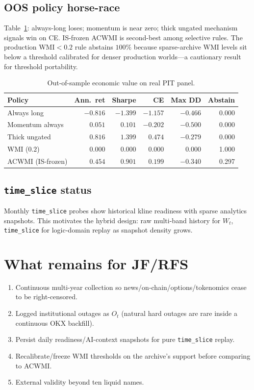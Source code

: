 \documentclass[12pt]{article}
\begin{document}
\subsection{OOS policy horse-race}
Table~\ref{tab:econ}: always-long loses; momentum is near zero; thick ungated mechanism signals win on CE. IS-frozen ACWMI is second-best among selective rules. The production WMI$<0.2$ rule abstains $100\%$ because sparse-archive WMI levels sit below a threshold calibrated for denser production worlds---a cautionary result for threshold portability.

\begin{table}[t]
\centering
\caption{Out-of-sample economic value on real PIT panel.}
\label{tab:econ}
\begin{tabular}{lrrrrr}
\toprule
Policy & Ann.\ ret & Sharpe & CE & Max DD & Abstain \\
\midrule
Always long & $-0.816$ & $-1.399$ & $-1.157$ & $-0.466$ & 0.000 \\
Momentum always & $0.051$ & $0.101$ & $-0.202$ & $-0.500$ & 0.000 \\
Thick ungated & $0.816$ & $1.399$ & $0.474$ & $-0.279$ & 0.000 \\
WMI ($0.2$) & $0.000$ & $0.000$ & $0.000$ & $0.000$ & 1.000 \\
ACWMI (IS-frozen) & $0.454$ & $0.901$ & $0.199$ & $-0.340$ & 0.297 \\
\bottomrule
\end{tabular}
\end{table}

\subsection{\texttt{time\_slice} status}
Monthly \texttt{time\_slice} probes show historical kline readiness with sparse analytics snapshots. This motivates the hybrid design: raw multi-band history for $W_t$, \texttt{time\_slice} for logic-domain replay as snapshot density grows.

\section{What remains for JF/RFS}

\begin{enumerate}
\item Continuous multi-year collection so news/on-chain/options/tokenomics cease to be right-censored.
\item Logged institutional outages as $O_t$ (natural hard outages are rare inside a continuous OKX backfill).
\item Persist daily readiness/AI-context snapshots for pure \texttt{time\_slice} replay.
\item Recalibrate/freeze WMI thresholds on the archive's support before comparing to ACWMI.
\item External validity beyond ten liquid names.
\end{enumerate}
\end{document}
